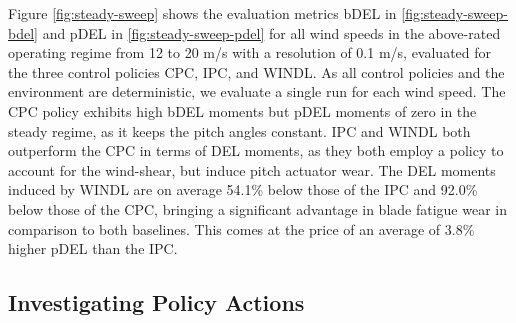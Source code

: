 Figure \ref{fig:steady-sweep} shows the evaluation metrics bDEL in \ref{fig:steady-sweep-bdel} and pDEL in \ref{fig:steady-sweep-pdel} for all wind speeds in the above-rated operating regime from 12 to 20 m/s with a resolution of 0.1 m/s, evaluated for the three control policies CPC, IPC, and WINDL. As all control policies and the environment are deterministic, we evaluate a single run for each wind speed. The CPC policy exhibits high bDEL moments but pDEL moments of zero in the steady regime, as it keeps the pitch angles constant. IPC and WINDL both outperform the CPC in terms of DEL moments, as they both employ a policy to account for the wind-shear, but induce pitch actuator wear. The DEL moments induced by WINDL are on average 54.1\% below those of the IPC and 92.0\% below those of the CPC, bringing a significant advantage in blade fatigue wear in comparison to both baselines. This comes at the price of an average of 3.8\% higher pDEL than the IPC.

\subsection{Investigating Policy Actions}

